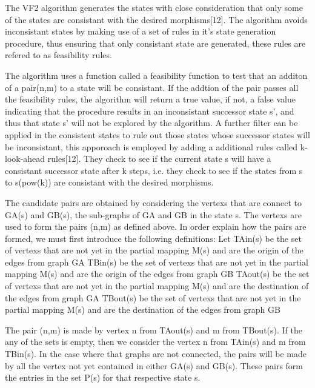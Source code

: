 The VF2 algorithm generates the states with close consideration that only some of the states are consistant with the desired morphisms[12]. The algorithm avoids inconsistant states by making use of a set of rules in it's state generation procedure, thus ensuring that only consistant state are generated, these rules are refered to as feasibility rules.\newline\newline

 The algorithm uses a function called a feasibility function to test that an additon of a pair(n,m) to a state will be consistant. If the addtion of the pair passes all the feasibility rules, the algorithm will return a true value, if not, a false value indicating that the procedure results in an inconsistant successor  state s', and thus that state s' will not be explored by the algorithm.\newline\newline
 A further filter can be applied in the consistent states to rule out those states whose successor states will be inconsistant, this apporoach is employed by adding a additional rules called k-look-ahead rules[12]. They check to see if the current state s will have a consistant successor state after k steps, i.e. they check to see if the states from s to s(pow(k)) are consistant with the desired morphisms.

 The candidate pairs are obtained by considering the vertexs that are connect to G{\tiny A}(s) and G{\tiny B}(s), the sub-graphs of G{\tiny A} and G{\tiny B} in the state s. The vertexs are used to form the pairs (n,m) as defined above. In order explain how the pairs are formed, we must first introduce the following definitions:
Let T{\tiny A}in(s) be the set of vertexs that are not yet in the partial mapping M(s) and are the origin of the edges from graph G{\tiny A}
	T{\tiny B}in(s) be the set of vertexs that are not yet in the partial mapping M(s) and are the origin of the edges from graph G{\tiny B}
	T{\tiny A}out(s) be the set of vertexs that are not yet in the partial mapping M(s) and are the destination of the edges from graph G{\tiny A}
	T{\tiny B}out(s) be the set of vertexs that are not yet in the partial mapping M(s) and are the destination of the edges from graph G{\tiny B}
	
The pair (n,m) is made by vertex n from T{\tiny A}out(s) and m from T{\tiny B}out(s). If the any of the sets is empty, then we consider the vertex n from T{\tiny A}in(s) and m from T{\tiny B}in(s). In the case where that graphs are not connected, the pairs will be made by all the vertex not yet contained in either G{\tiny A}(s) and G{\tiny B}(s). These pairs form the entries in the set P(s) for that respective state s.

